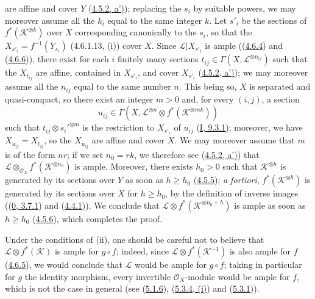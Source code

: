 are affine and cover $Y$
(\hyperref[II.4.5.2]{4.5.2, a')});
replacing the $s_i$ by suitable powers, we may moreover
assume all the $k_i$ equal to the same integer $k$. Let $s'_i$ be the
sections of $f^*(\mathcal{K}^{\otimes k})$ over $X$ corresponding
canonically to the $s_i$, so that the
$X_{s'_i}=f^{-1}(Y_{s_i})$ (4.6.1.13, (i))
cover $X$. Since $\mathcal{L}|X_{s'_i}$ is ample
((\hyperref[II.4.6.4]{4.6.4}) and
(\hyperref[II.4.6.6]{4.6.6})), there exist for each $i$ finitely many
sections $t_{ij}\in\Gamma(X,\mathcal{L}^{\otimes n_{ij}})$ such that the
$X_{t_{ij}}$ are affine, contained in $X_{s'_i}$, and cover
$X_{s'_i}$ (\hyperref[II.4.5.2]{4.5.2, a')}); we may moreover
assume all the $n_{ij}$ equal to the same number $n$. This being so, $X$ is
separated and quasi-compact, so there exist an integer $m>0$ and, for every
$(i,j)$, a section
\[
  u_{ij}\in\Gamma(X,\mathcal{L}^{\otimes n}\otimes
  f^*(\mathcal{K}^{\otimes mk}))
\]
such that $t_{ij}\otimes s_i'^{\otimes m}$ is the restriction to $X_{s'_i}$
of $u_{ij}$ (\hyperref[I.9.3.1]{I, 9.3.1}); moreover, we have
$X_{u_{ij}}=X_{t_{ij}}$, so the $X_{u_{ij}}$ are affine and cover
$X$. We may moreover assume that $m$ is of the form $nr$; if we set
$n_0=rk$, we therefore see (\hyperref[II.4.5.2]{4.5.2, a')}) that
$\mathcal{L}\otimes_{\mathcal{O}_X}f^*(\mathcal{K}^{\otimes n_0})$ is
ample. Moreover,
there exists $h_0>0$ such that $\mathcal{K}^{\otimes h}$ is generated by its
sections over $Y$ as soon as $h\geq h_0$
(\hyperref[II.4.5.5]{4.5.5}); \emph{a fortiori},
$f^*(\mathcal{K}^{\otimes h})$ is generated by its sections over
$X$ for $h\geq h_0$, by the definition of inverse images
((\hyperref[0.3.7.1]{0, 3.7.1}) and
(\hyperref[II.4.4.1]{4.4.1})). We conclude that
$\mathcal{L}\otimes f^*(\mathcal{K}^{\otimes n_0+h})$ is ample as soon as
$h\geq h_0$ (\hyperref[II.4.5.6]{4.5.6}), which completes the
proof.

\begin{remark}[4.6.14]
\label{II.4.6.14}
Under the conditions of (ii), one should be careful not to believe that
$\mathcal{L}\otimes f^*(\mathcal{K})$ is ample for $g\circ f$; indeed,
since $\mathcal{L}\otimes f^*(\mathcal{K}^{-1})$ is also ample for $f$
(\hyperref[II.4.6.5]{4.6.5}), we would conclude that $\mathcal{L}$ would be
ample for $g\circ f$; taking in particular for $g$ the identity
morphism, every invertible $\mathcal{O}_X$-module would be ample for $f$, which
is not the case in general (see (\hyperref[II.5.1.6]{5.1.6}),
(\hyperref[II.5.3.4]{5.3.4, (i)}) and
(\hyperref[II.5.3.1]{5.3.1})).
\end{remark}

